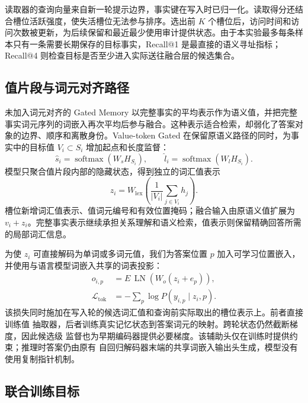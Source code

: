 \documentclass[letterpaper]{article}
\begin{document}
读取器的查询向量来自新一轮提示边界，事实键在写入时已归一化。读取得分还结合槽位活跃强度，使失活槽位无法参与排序。选出前 $K$ 个槽位后，访问时间和访问次数被更新，为后续保留和最近最少使用审计提供状态。由于本实验最多每条样本只有一条需要长期保存的目标事实，Recall@1 是最直接的语义寻址指标；Recall@4 则检查目标是否至少进入实际送往融合层的候选集合。

\subsection{值片段与词元对齐路径}

未加入词元对齐的 Gated Memory 以完整事实的平均表示作为语义值，并把完整事实词元序列的词嵌入再次平均后参与融合。这种表示适合检索，却弱化了答案对象的边界、顺序和离散身份。Value-token Gated 在保留原语义路径的同时，为事实中的目标值 $V_i\subset S_i$ 增加起点和长度监督：
\begin{equation}
\hat s_i=\operatorname{softmax}(W_s H_{S_i}),\qquad
\hat l_i=\operatorname{softmax}(W_l H_{S_i}).
\end{equation}
模型只聚合值片段内部的隐藏状态，得到独立的词汇值表示
\begin{equation}
z_i=W_{\mathrm{lex}}
\left(\frac{1}{|V_i|}\sum_{j\in V_i}h_j\right).
\end{equation}
槽位新增词汇值表示、值词元编号和有效位置掩码；融合输入由原语义值扩展为 $v_i+z_i$。完整事实表示继续承担关系理解和语义检索，值表示则保留精确回答所需的局部词汇信息。

为使 $z_i$ 可直接解码为单词或多词元值，我们为答案位置 $p$ 加入可学习位置嵌入，并使用与语言模型词嵌入共享的词表投影：
\begin{equation}
\begin{split}
o_{i,p}&=E\,\operatorname{LN}
\left(W_o(z_i+e_p)\right),\\
\mathcal{L}_{\mathrm{tok}}&=
 -\sum_p\log P(y_{i,p}\mid z_i,p).
\end{split}
\end{equation}
该损失同时施加在写入轮的候选词汇值和查询前实际取出的槽位表示上。前者直接训练值
抽取器，后者训练真实记忆状态到答案词元的映射。跨轮状态仍然截断梯度，因此候选级
监督也为早期编码器提供必要梯度。该辅助头仅在训练时提供约束；推理时答案仍由原有
自回归解码器末端的共享词嵌入输出头生成，模型没有使用复制指针机制。

\subsection{联合训练目标}
\end{document}
